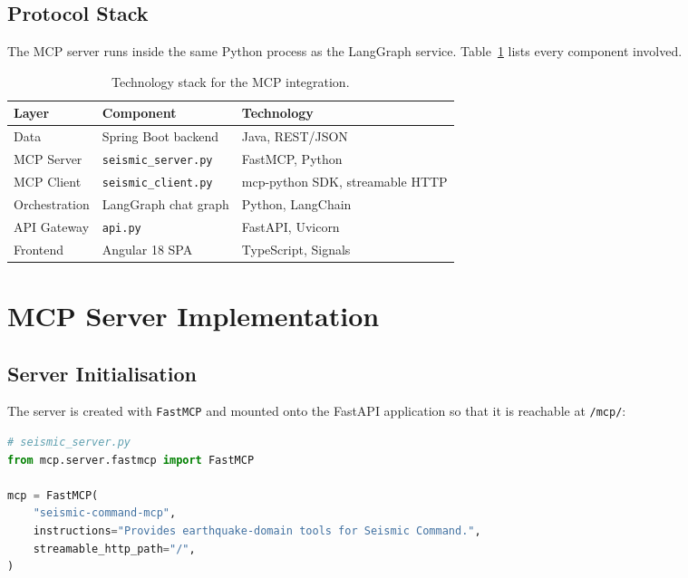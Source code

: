 \documentclass[11pt,a4paper]{article}
\begin{document}
\subsection{Protocol Stack}

The MCP server runs inside the same Python process as the LangGraph service.
Table~\ref{tab:stack} lists every component involved.

\begin{table}[H]
\centering
\begin{tabular}{@{}lll@{}}
\toprule
\textbf{Layer} & \textbf{Component} & \textbf{Technology} \\
\midrule
Data             & Spring Boot backend  & Java, REST/JSON \\
MCP Server       & \texttt{seismic\_server.py}   & FastMCP, Python \\
MCP Client       & \texttt{seismic\_client.py}   & mcp-python SDK, streamable HTTP \\
Orchestration    & LangGraph chat graph & Python, LangChain \\
API Gateway      & \texttt{api.py}               & FastAPI, Uvicorn \\
Frontend         & Angular 18 SPA       & TypeScript, Signals \\
\bottomrule
\end{tabular}
\caption{Technology stack for the MCP integration.}
\label{tab:stack}
\end{table}

\section{MCP Server Implementation}

\subsection{Server Initialisation}

The server is created with \texttt{FastMCP} and mounted onto the FastAPI application
so that it is reachable at \texttt{/mcp/}:

\begin{lstlisting}[style=codestyle, language=Python]
# seismic_server.py
from mcp.server.fastmcp import FastMCP

mcp = FastMCP(
    "seismic-command-mcp",
    instructions="Provides earthquake-domain tools for Seismic Command.",
    streamable_http_path="/",
)
\end{lstlisting}
\end{document}
